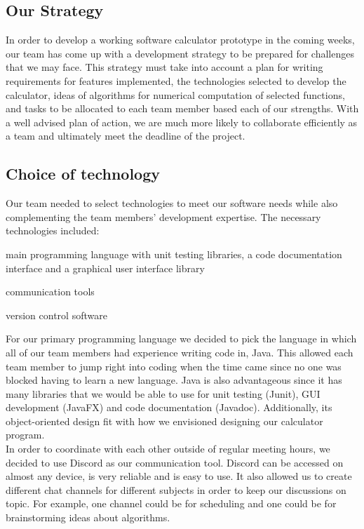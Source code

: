 \documentclass[a4paper]{article}
\begin{document}
\subsection{Our Strategy}

In order to develop a working software calculator prototype in the coming weeks, our team has come up with a development strategy to be prepared for challenges that we may face. This strategy must take into account a plan for writing requirements for features implemented, the technologies selected to develop the calculator, ideas of algorithms for numerical computation of selected functions, and tasks to be allocated to each team member based each of our strengths. With a well advised plan of action, we are much more likely to collaborate efficiently as a team and ultimately meet the deadline of the project. 

\subsection{Choice of technology}

Our team needed to select technologies to meet our software needs while also complementing the team members’ development expertise. The necessary technologies included:
\medskip
\begin{compactitem}
\item main programming language with unit testing libraries, a code documentation interface and a graphical user interface library
\item communication tools
\item version control software
\end{compactitem}
\medskip
For our primary programming language we decided to pick the language in which all of our team members had experience writing code in, Java. This allowed each team member to jump right into coding when the time came since no one was blocked having to learn a new language. Java is also advantageous since it has many libraries that we would be able to use for unit testing (Junit), GUI development (JavaFX) and code documentation (Javadoc). Additionally, its object-oriented design fit with how we envisioned designing our calculator program. \\

In order to coordinate with each other outside of regular meeting hours, we decided to use Discord as our communication tool. Discord can be accessed on almost any device, is very reliable and is easy to use. It also allowed us to create different chat channels for different subjects in order to keep our discussions on topic. For example, one channel could be for scheduling and one could be for brainstorming ideas about algorithms. \\
\end{document}
